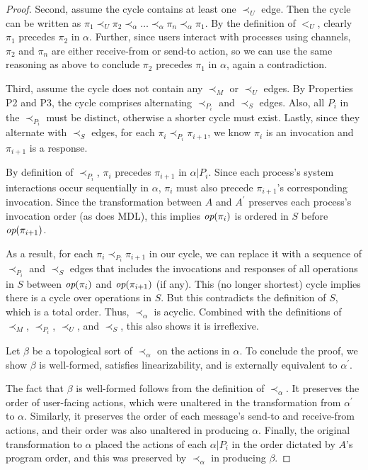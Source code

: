 \begin{proof}
Second, assume the cycle contains at least one $\prec_U$ edge. Then the cycle can be
written as
$\pi_1 \prec_U \pi_2 \prec_{\alpha} \ldots \prec_{\alpha} \pi_n \prec_{\alpha} \pi_1$. By the definition of $<_U$, clearly $\pi_1$ precedes $\pi_2$ in $\alpha$.
Further, since users interact with processes using channels, $\pi_2$ and
$\pi_n$ are either receive-from or send-to action, so we can use the same
reasoning as above to conclude $\pi_2$ precedes $\pi_1$ in $\alpha$, again a
contradiction. 

Third, assume the cycle does not contain any $\prec_M$ or $\prec_U$ edges.
By Properties P2 and P3, the cycle comprises alternating
$\prec_{P_i}$ and $\prec_S$ edges. Also, all $P_i$ in the $\prec_{P_i}$
must be distinct, otherwise a shorter cycle must exist.
Lastly, since they alternate with $\prec_S$ edges,
for each $\pi_i \prec_{P_i} \pi_{i+1}$, we know 
$\pi_i$ is an invocation and $\pi_{i+1}$ is a response.

By definition of $\prec_{P_i}$, $\pi_i$ precedes $\pi_{i+1}$ in $\alpha | P_i$.
Since each process’s system interactions occur sequentially in $\alpha$,
$\pi_{i}$ must also precede $\pi_{i+1}$'s corresponding invocation.
Since the transformation between $A$ and $A^\prime$ preserves each process’s
invocation order (as does MDL), this implies $\operatorname*{\textit{op}}(\pi_{i})$ is ordered in $S$
before $\operatorname*{\textit{op}}(\pi_{i+1})$.

As a result, for each $\pi_i \prec_{P_i} \pi_{i+1}$ in our cycle, we can replace it
with a sequence of $\prec_{P_i}$ and $\prec_S$ edges that includes the invocations 
and responses of all operations in $S$ between $\operatorname*{\textit{op}}(\pi_i)$ and $\operatorname*{\textit{op}}(\pi_{i+1})$
(if any). This (no longer shortest) cycle implies there is a cycle over operations 
in $S$. But this contradicts the definition of $S$, which is a 
total order. Thus, $\prec_{\alpha}$ is acyclic. Combined with the
definitions of $\prec_M$, $\prec_{P_i}$, $\prec_U$, and $\prec_S$, this also
shows it is irreflexive.

Let $\beta$ be a topological sort of $\prec_{\alpha}$ on the actions in
$\alpha$. To conclude the proof, we show $\beta$ is well-formed,
satisfies linearizability, and is externally equivalent to $\alpha^\prime$.

The fact that $\beta$ is well-formed follows from the definition of
$\prec_{\alpha}$. It preserves the order of user-facing actions,
which were unaltered in the transformation from $\alpha^\prime$ to $\alpha$.
Similarly, it preserves the order of each message's send-to and receive-from actions,
and their order was also unaltered in producing $\alpha$. Finally, the original
transformation to $\alpha$ placed the actions of each $\alpha | P_i$ in
the order dictated by $A$'s program order, and this was preserved by
$\prec_{\alpha}$ in producing $\beta$.


\end{proof}
